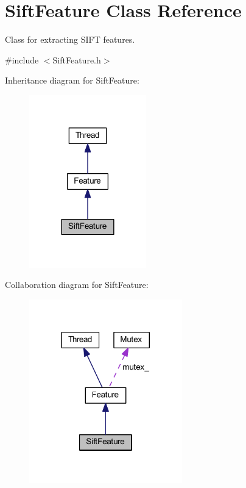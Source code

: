 \hypertarget{class_sift_feature}{\section{Sift\-Feature Class Reference}
\label{class_sift_feature}
}


Class for extracting S\-I\-F\-T features.  




{\ttfamily \#include $<$Sift\-Feature.\-h$>$}



Inheritance diagram for Sift\-Feature\-:\nopagebreak
\begin{figure}[H]
\begin{center}
\leavevmode
\includegraphics[width=144pt]{class_sift_feature__inherit__graph}
\end{center}
\end{figure}


Collaboration diagram for Sift\-Feature\-:\nopagebreak
\begin{figure}[H]
\begin{center}
\leavevmode
\includegraphics[width=188pt]{class_sift_feature__coll__graph}
\end{center}
\end{figure}
